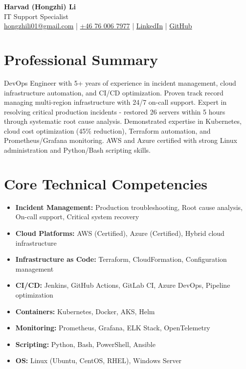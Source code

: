 \documentclass[11pt,a4paper]{article}
\begin{document}
\begin{center}
{\LARGE \textbf{Harvad (Hongzhi) Li}}\\[10pt]
{\Large IT Support Specialist}\\[10pt]
\textcolor{linkedinblue}{\href{mailto:hongzhili01@gmail.com}{hongzhili01@gmail.com} | \href{tel:+46760067977}{+46 76 006 7977} | \href{https://www.linkedin.com/in/harvad/}{LinkedIn} | \href{https://github.com/bluehawana}{GitHub}}
\end{center}

\vspace{8pt}

\section*{Professional Summary}

DevOps Engineer with 5+ years of experience in incident management, cloud infrastructure automation, and CI/CD optimization. Proven track record managing multi-region infrastructure with 24/7 on-call support. Expert in resolving critical production incidents - restored 26 servers within 5 hours through systematic root cause analysis. Demonstrated expertise in Kubernetes, cloud cost optimization (45\% reduction), Terraform automation, and Prometheus/Grafana monitoring. AWS and Azure certified with strong Linux administration and Python/Bash scripting skills.

\section*{Core Technical Competencies}

\begin{itemize}[leftmargin=*, itemsep=2pt]
\item \textbf{Incident Management:} Production troubleshooting, Root cause analysis, On-call support, Critical system recovery
\item \textbf{Cloud Platforms:} AWS (Certified), Azure (Certified), Hybrid cloud infrastructure
\item \textbf{Infrastructure as Code:} Terraform, CloudFormation, Configuration management
\item \textbf{CI/CD:} Jenkins, GitHub Actions, GitLab CI, Azure DevOps, Pipeline optimization
\item \textbf{Containers:} Kubernetes, Docker, AKS, Helm
\item \textbf{Monitoring:} Prometheus, Grafana, ELK Stack, OpenTelemetry
\item \textbf{Scripting:} Python, Bash, PowerShell, Ansible
\item \textbf{OS:} Linux (Ubuntu, CentOS, RHEL), Windows Server
\end{itemize}
\end{document}

